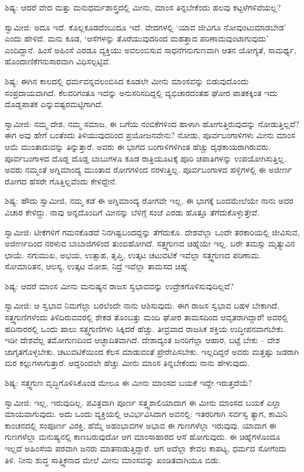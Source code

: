 ಶಿಷ್ಯ: ಆದರೆ ವೇದ ಮತ್ತು ಮನುಧರ್ಮಶಾಸ್ತ್ರದಲ್ಲಿ ಮೀನು, ಮಾಂಸ ತಿನ್ನಬೇಕೆಂದು ಹಲವು ಕಟ್ಟಳೆಗಳಿವೆಯಲ್ಲ?

ಸ್ವಾಮೀಜಿ: ಅದೂ ಇದೆ. ಕೊಲ್ಲಕೂಡದೆಂಬುದೂ ಇದೆ. ವೇದಗಳಲ್ಲಿ ‘ಯಾವ ಜೀವಿಗೂ ನೋವುಂಟುಮಾಡಬೇಡ’ ಎಂದು ಹೇಳಿದೆ. ಮನು ಕೂಡ, ‘ಆಸೆಗಳನ್ನು ತೊರೆಯುವುದರಿಂದ ಮಹತ್ತಾದ ಪರಿಣಾಮವುಂಟಾಗುವುದು’ ಎಂದಿದ್ದಾನೆ. ಹಿಂಸೆ ಅಹಿಂಸೆ ಎರಡೂ ವ್ಯಕ್ತಿಯು ಅವಲಂಬಿಸುವ ಸಾಧನೆಗನುಗುಣವಾಗಿ ಆತನ ಯೋಗ್ಯತೆ, ಸಾಮರ್ಥ್ಯ, ಹೊಂದಾಣಿಕೆಗನುಸಾರವಾಗಿ ವಿಧಿಸಲ್ಪಟ್ಟಿವೆ.

ಶಿಷ್ಯ: ಈಗಿನ ಕಾಲದಲ್ಲಿ ಧರ್ಮವನ್ನವಲಂಬಿಸಿದ ಕೂಡಲೇ ಮೀನು ಮಾಂಸವನ್ನು ಬಿಡುವುದೊಂದು ಸಂಪ್ರದಾಯವಾಗಿದೆ. ಕೆಲವರಿಗಂತೂ ಇದನ್ನು ಅನುಸರಿಸದಿದ್ದಲ್ಲಿ ವ್ಯಭಿಚಾರದಂತಹ ಘೋರ ಪಾತಕಕ್ಕಿಂತ ಇದು ದೊಡ್ಡಪಾತಕ ಎನ್ನುವಷ್ಟರಮಟ್ಟಿಗಾಗಿದೆ.

ಸ್ವಾಮೀಜಿ: ನಮ್ಮ ದೇಶ, ನಮ್ಮ ಸಮಾಜ, ಈ ಬಗೆಯ ನಂಬಿಕೆಗಳಿಂದ ಹಾಳಾಗಿ ಹೋಗುತ್ತಿರುವುದನ್ನು ನೋಡುತ್ತಿಲ್ಲವೆ? ಈಗ ಅವು ಹೇಗೆ ಬಂತೆಂದು ತಿಳಿಯುವುದರಿಂದ ಪ್ರಯೋಜನವೇನು? ನೋಡು, ಪೂರ್ವಬಂಗಾಳಿಗಳು ಮೀನು ಮಾಂಸ ಆಮೆ ಮುಂತಾದುವನ್ನು ತಿನ್ನುತ್ತಾರೆ. ಅವರು ಈ ಭಾಗದ ಬಂಗಾಳಿಗಳಿಗಿಂತ ಹೆಚ್ಚು ದೃಢಕಾಯರಾಗಿರುವರು. ಪೂರ್ವಬಂಗಾಳದ ದೊಡ್ಡ ದೊಡ್ಡ ಬಾಬುಗಳೂ ಕೂಡ ರಾತ್ರಿಯೂಟಕ್ಕೆ ಪೂರಿ ಚಪಾತಿಗಳನ್ನು ಉಪಯೋಗಿಸುತ್ತಿಲ್ಲ. ಅವರು ನಮ್ಮಂತೆ ಅಗ್ನಿಮಾಂದ್ಯ ಮುಂತಾದ ರೋಗಗಳಿಂದ ನರಳುತ್ತಿಲ್ಲ. ಪೂರ್ವಬಂಗಾಳದ ಹಳ್ಳಿಗಳಲ್ಲಿ ಈ ಅಜೀರ್ಣ ರೋಗದ ಹೆಸರೇ ಗೊತ್ತಿಲ್ಲವೆಂದು ಕೇಳಿದ್ದೇನೆ.

ಶಿಷ್ಯ: ಹೌದು ಸ್ವಾಮೀಜಿ, ನಮ್ಮ ಕಡೆ ಈ ಅಗ್ನಿಮಾಂದ್ಯ ರೋಗವೇ ಇಲ್ಲ. ಈ ಭಾಗಕ್ಕೆ ಬಂದಮೇಲೆಯೇ ನಾನು ಅದರ ವಿಚಾರ ಕೇಳಿದ್ದು. ನಾವು ಅನ್ನದೊಂದಿಗೆ ಮೀನನ್ನು ಬೆಳಿಗ್ಗೆ ಸಂಜೆ ಎರಡು ಹೊತ್ತೂ ತೆಗೆದುಕೊಳ್ಳುತ್ತೇವೆ.

ಸ್ವಾಮೀಜಿ: ಟೀಕೆಗಳಿಗೆ ಗಮನಕೊಡದೆ ನಿನಗಿಷ್ಟಬಂದದ್ದನ್ನು ತೆಗೆದುಕೊ. ದೇಶವೆಲ್ಲಾ ಒಂದೇ ತರಕಾರಿಯಲ್ಲಿ ಜೀವಿಸುವ, ಅಜೀರ್ಣದಿಂದ ನರಳುವ ಬಾಬಾಜಿಗಳಿಂದ ತುಂಬಿಹೋಗಿದೆ. ಸತ್ತ್ವಗುಣದ ಚಿಹ್ನೆಯೇ ಇಲ್ಲ. ಬರೇ ತಮಸ್ಸು ಮೃತ್ಯುವಿನ ಛಾಯೆ. ನಗುಮುಖ, ಅಭಯ, ಉತ್ಸಾಹ, ತೃಪ್ತಿ, ಉತ್ಕಟ ಚಟುವಟಿಕೆ ಇವೆಲ್ಲಾ ಸತ್ತ್ವಗುಣದ ಪರಿಣಾಮ. ಸೋಮಾರಿತನ, ಆಲಸ್ಯ, ಉತ್ಕಟ ಮೋಹ, ನಿದ್ರೆ ಇವೆಲ್ಲಾ ತಾಮಸದ ಚಿಹ್ನೆ.

ಶಿಷ್ಯ: ಆದರೆ ಮಾಂಸ ಮೀನು ಮನುಷ್ಯನ ರಾಜಸ ಸ್ವಭಾವವನ್ನು ಉದ್ರೇಕಗೊಳಿಸುವುದಿಲ್ಲವೆ?

ಸ್ವಾಮೀಜಿ: ಆ ಸ್ವಭಾವ ನಿಮಗೆಲ್ಲಾ ಬರಲೆಂದೇ ನಾನು ಆಶಿಸುವುದು. ಈಗ ರಾಜಸ ಸ್ವಭಾವ ಬಹಳ ಬೇಕಾಗಿದೆ. ಸತ್ತ್ವಗುಣಿಗಳೆಂದು ತಿಳಿದಿರುವವರಲ್ಲಿ ಶೇಕಡ ತೊಂಬತ್ತು ಮಂದಿ ಘೋರ ತಾಮಸದಿಂದ ಆವೃತರಾಗಿದ್ದಾರೆ! ಅವರಲ್ಲಿ ಹದಿನಾರರಲ್ಲಿ ಒಂದು ಪಾಲು ಸತ್ತ್ವಗುಣಿಗಳು ಸಿಕ್ಕಿದರೆ ಹೆಚ್ಚು. ತೀವ್ರವಾದ ರಾಜಸಿಕ ಶಕ್ತಿಯ ಉದ್ಧೀಪನವಾಗಬೇಕು. ಇಡೀ ದೇಶವೆಲ್ಲ ತಮೋಗುಣದಿಂದ ಆಚ್ಛಾದಿತವಾಗಿದೆ. ದೇಶಾದ್ಯಂತ ಜನರಿಗೆಲ್ಲಾ ಆಹಾರ, ಬಟ್ಟೆ ಬೇಕು – ದೇಶ ಜಾಗೃತಗೊಳ್ಳಬೇಕು. ಚಟುವಟಿಕೆಯಿಂದ ಕೆಲಸ ಮಾಡುವಂತೆ ಪ್ರೇರೇಪಿಸಬೇಕು. ಇಲ್ಲದಿದ್ದರೆ ಅವರು ಮತ್ತಷ್ಟು ಜಡರಾಗಿ ಮರ ಕಲ್ಲುಗಳಾಗುತ್ತಾರೆ. ಆದ್ದರಿಂದಲೇ ಹೆಚ್ಚು ಮೀನು ಮಾಂಸ ತಿನ್ನಬೇಕೆಂದು ನಾನು ಹೇಳುವುದು.

ಶಿಷ್ಯ: ಸತ್ತ್ವಗುಣ ವೃದ್ಧಿಗೊಳಿಸಿಕೊಂಡ ಮೇಲೂ ಈ ಮೀನು ಮಾಂಸದ ಬಯಕೆ ಇದ್ದೇ ಇರುತ್ತದೆಯೆ?

ಸ್ವಾಮೀಜಿ: ಇಲ್ಲ, ಇರುವುದಿಲ್ಲ. ಪವಿತ್ರವಾಗಿ ಪೂರ್ಣ ಸತ್ತ್ವಶಾಲಿಯಾದಾಗ ಈ ಮೀನು ಮಾಂಸದ ಬಯಕೆ ಎಲ್ಲಾ ಮಾಯವಾಗುವುದು. ಅದು ಒಂದು ವ್ಯಕ್ತಿಯಲ್ಲಿ ಆವಿರ್ಭವಿಸಿದಾಗ ಅವನಲ್ಲಿ: ಇತರರಿಗಾಗಿ ಸರ್ವಸ್ವ ತ್ಯಾಗ, ಕಾಮಿನಿ ಕಾಂಚನದಲ್ಲಿ ಸಂಪೂರ್ಣ ವಿರಕ್ತಿ, ಹೆಮ್ಮೆ ಅಹಂಭಾವಗಳ ಅಭಾವ ಈ ಗುಣಗಳೆಲ್ಲಾ ಇರುವುವು. ಯಾವಾಗ ಈ ಗುಣಗಳೆಲ್ಲಾ ಮನುಷ್ಯನಲ್ಲಿ ಕಾಣಬರುವುದೋ ಆಗ ಮಾಂಸಾಹಾರದ ಆಸೆ ಹೋಗುವುದು. ಈ ಚಿಹ್ನೆಗಳೊಂದೂ ಇಲ್ಲದೆ ಅಹಿಂಸೆಯ ಪರವಾಗಿ ಜನರು ಮಾತನಾಡುತ್ತಿದ್ದಾರೆ. ಆಗ ಅದೆಲ್ಲಾ ಕೇವಲ ಕಾಪಟ್ಯ, ಧರ್ಮದ ಸೋಗೆಂದು ತಿಳಿ. ನೀನು ಶುದ್ಧ ಸಾತ್ತ್ವಿಕನಾದ ಮೇಲೆ ಮೀನು ಮಾಂಸವನ್ನು ಖಂಡಿತವಾಗಿಯೂ ಬಿಡು.


